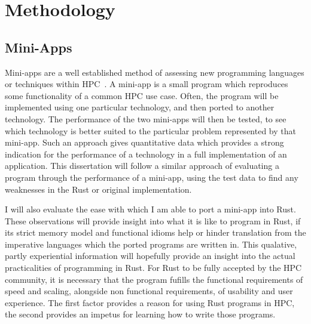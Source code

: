 \chapter{Methodology}
\section{Mini-Apps}
Mini-apps are a well established method of assessing new programming languages or techniques within HPC~\cite{Mallinson:2014, Slaughter:2015, martineau2017arch}. A mini-app is a small program which reproduces some functionality of a common HPC use case. Often, the program will be implemented using one particular technology, and then ported to another technology. The performance of the two mini-apps will then be tested, to see which technology is better suited to the particular problem represented by that mini-app. Such an approach gives quantitative data which provides a strong indication for the performance of a technology in a full implementation of an application. This dissertation will follow a similar approach of evaluating a program through the performance of a mini-app, using the test data to find any weaknesses in the Rust or original implementation.

I will also evaluate the ease with which I am able to port a mini-app into Rust. These observations will provide insight into what it is like to program in Rust, if its strict memory model and functional idioms help or hinder translation from the imperative languages which the ported programs are written in. This qualative, partly experiential information will hopefully provide an insight into the actual practicalities of programming in Rust. For Rust to be fully accepted by the HPC community, it is necessary that the program fufills the functional requirements of speed and scaling, alongside non functional requirements, of usability and user experience. The first factor provides a reason for using Rust programs in HPC, the second provides an impetus for learning how to write those programs.
